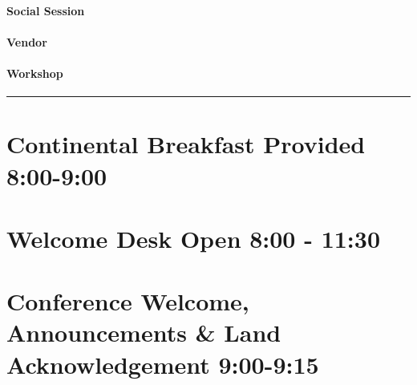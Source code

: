 \documentclass[
]{book}
\begin{document}
\begin{social}
\hypertarget{social-session}{%
\paragraph{Social Session}\label{social-session}}
\end{social}

\begin{vendor}
\hypertarget{vendor}{%
\paragraph{Vendor}\label{vendor}}
\end{vendor}

\begin{workshop}
\hypertarget{workshop}{%
\paragraph{Workshop}\label{workshop}}
\end{workshop}

\begin{center}\rule{0.5\linewidth}{0.5pt}\end{center}

\hypertarget{continental-breakfast-provided-800-900-2}{%
\section*{Continental Breakfast Provided \textbar{} 8:00-9:00}\label{continental-breakfast-provided-800-900-2}}

\hypertarget{welcome-desk-open-800---1130-2}{%
\section*{Welcome Desk Open \textbar{} 8:00 - 11:30}\label{welcome-desk-open-800---1130-2}}

\hypertarget{conference-welcome-announcements-land-acknowledgement-900-915-2}{%
\section*{Conference Welcome, Announcements \& Land Acknowledgement \textbar{} 9:00-9:15}\label{conference-welcome-announcements-land-acknowledgement-900-915-2}}
\end{document}
